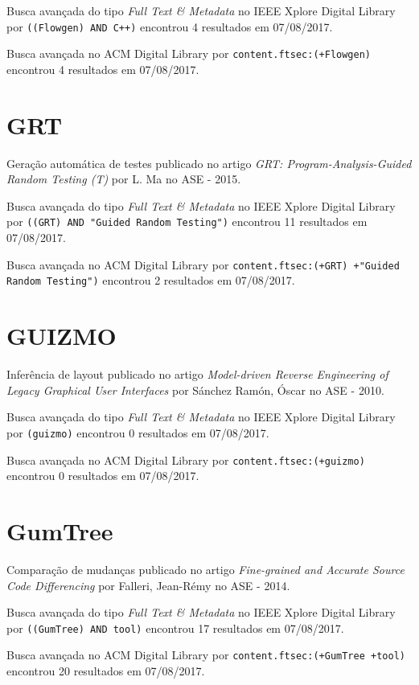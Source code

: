 Busca avançada do tipo {\it Full Text \& Metadata} no IEEE Xplore Digital Library por
\texttt{((Flowgen) AND C++)}
encontrou
4 resultados em
07/08/2017.

Busca avançada no ACM Digital Library por
\texttt{content.ftsec:(+Flowgen)}
encontrou
4 resultados em
07/08/2017.

\section{GRT}

Geração automática de testes
publicado no artigo
{\it GRT: Program-Analysis-Guided Random Testing (T)}
por
L. Ma
no
ASE
-
2015.

Busca avançada do tipo {\it Full Text \& Metadata} no IEEE Xplore Digital Library por
\texttt{((GRT) AND "Guided Random Testing")}
encontrou
11 resultados em
07/08/2017.

Busca avançada no ACM Digital Library por
\texttt{content.ftsec:(+GRT) +"Guided Random Testing")}
encontrou
2 resultados em
07/08/2017.

\section{GUIZMO}

Inferência de layout
publicado no artigo
{\it Model-driven Reverse Engineering of Legacy Graphical User Interfaces}
por
S\'{a}nchez Ram\'{o}n, \'{O}scar
no
ASE
-
2010.

Busca avançada do tipo {\it Full Text \& Metadata} no IEEE Xplore Digital Library por
\texttt{(guizmo)}
encontrou
0 resultados em
07/08/2017.

Busca avançada no ACM Digital Library por
\texttt{content.ftsec:(+guizmo)}
encontrou
0 resultados em
07/08/2017.

\section{GumTree}

Comparação de mudanças
publicado no artigo
{\it Fine-grained and Accurate Source Code Differencing}
por
Falleri, Jean-R{\'e}my
no
ASE
-
2014.

Busca avançada do tipo {\it Full Text \& Metadata} no IEEE Xplore Digital Library por
\texttt{((GumTree) AND tool)}
encontrou
17 resultados em
07/08/2017.

Busca avançada no ACM Digital Library por
\texttt{content.ftsec:(+GumTree +tool)}
encontrou
20 resultados em
07/08/2017.

